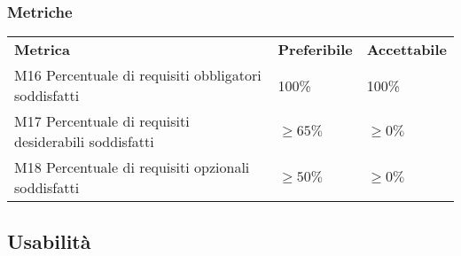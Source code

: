         \subsubsection{Metriche}
        \begin{longtable} {
        		>{}p{80mm} 
        		>{}p{25mm}
        		>{}p{25mm}
        	}
        	\rowcolor{gray!50}
        	\textbf{Metrica} & \textbf{Preferibile} & \textbf{Accettabile} \TBstrut \TBstrut \\
        	M16 Percentuale di requisiti obbligatori soddisfatti & 100\% & 100\% \TBstrut \\ [2mm]
        	M17 Percentuale di requisiti desiderabili soddisfatti & $\ge65\%$ & $\ge0\%$ \TBstrut \\ [2mm]
        	M18 Percentuale di requisiti opzionali soddisfatti & $\ge50\%$ & $\ge0\%$ \TBstrut \\ [2mm]
        \end{longtable}
    \subsection{Usabilità}
